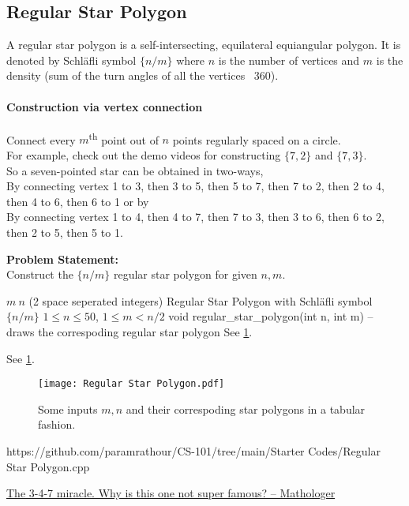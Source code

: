 \documentclass[../../Problems]{subfiles}
\begin{document}
\subsection{Regular Star Polygon}{\label{pp:regularstarpolygon}}
A regular star polygon is a self-intersecting, equilateral equiangular polygon. It is denoted by Schl\"afli symbol $\{n/m\}$ where $n$ is the number of vertices and $m$ is the density (sum of the turn angles of all the vertices \ 360\textdegree).
\vspace{-1em}\paragraph{Construction via vertex connection} Connect every $m$\textsuperscript{th} point out of $n$ points regularly spaced on a circle.\\
For example, check out the demo videos for constructing \href{https://github.com/paramrathour/CS-101/tree/main/Media/Regular Star Polygon/7-2.mkv}{$\{7,2\}$} and \href{https://github.com/paramrathour/CS-101/tree/main/Media/Regular Star Polygon/7-3.mkv}{$\{7,3\}$}.\\
So a seven-pointed star can be obtained in two-ways,\\
By connecting vertex 1 to 3, then 3 to 5, then 5 to 7, then 7 to 2, then 2 to 4, then 4 to 6, then 6 to 1 or by\\
By connecting vertex 1 to 4, then 4 to 7, then 7 to 3, then 3 to 6, then 6 to 2, then 2 to 5, then 5 to 1.

\textbf{Problem Statement:}\\
Construct the $\{n/m\}$ regular star polygon for given $n,m$.
\begin{testcasesFunction}
	{$m\ n$ \hfill(2 space seperated integers)}
	{Regular Star Polygon with Schl\"afli symbol $\{n/m\}$}
	{$1 \leq n \leq 50$, $1 \leq m < n/2$}
	{void regular\_star\_polygon(int n, int m) -- draws the correspoding regular star polygon}
	{See \ref{fig:regularstarpolygon}.}
	{See \ref{fig:regularstarpolygon}.
	\begin{figure}[H]
	\texttt{[image: Regular Star Polygon.pdf]}
	\caption{Some inputs $m,n$ and their correspoding star polygons in a tabular fashion.}
	\label{fig:regularstarpolygon}
	\end{figure}
	}
	{https://github.com/paramrathour/CS-101/tree/main/Starter Codes/Regular Star Polygon.cpp}
\end{testcasesFunction}
\begin{funvideo}
\href{https://youtu.be/oEN0o9ZGmOM}{The 3-4-7 miracle. Why is this one not super famous? -- Mathologer}
\end{funvideo}
\end{document}
